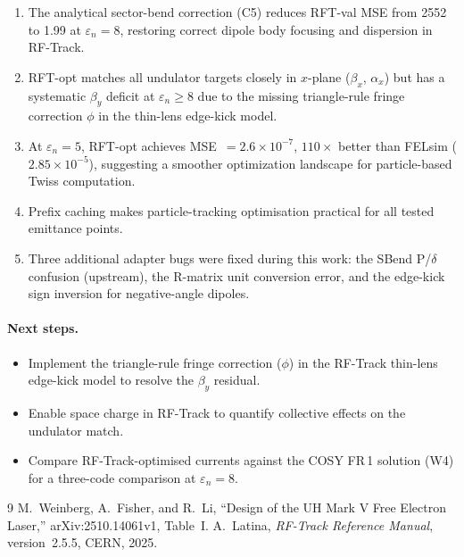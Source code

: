 \documentclass[11pt]{article}
\begin{document}
\begin{enumerate}
  \item The analytical sector-bend correction (C5) reduces RFT-val MSE
    from 2552 to 1.99 at $\varepsilon_n = 8$, restoring correct dipole
    body focusing and dispersion in RF-Track.
  \item RFT-opt matches all undulator targets closely in $x$-plane
    ($\beta_x$, $\alpha_x$) but has a systematic $\beta_y$ deficit at
    $\varepsilon_n \geq 8$ due to the missing triangle-rule fringe
    correction $\phi$ in the thin-lens edge-kick model.
  \item At $\varepsilon_n = 5$, RFT-opt achieves MSE~$= 2.6 \times 10^{-7}$,
    $110\times$ better than FELsim ($2.85 \times 10^{-5}$), suggesting a
    smoother optimization landscape for particle-based Twiss computation.
  \item Prefix caching makes particle-tracking optimisation practical for
    all tested emittance points.
  \item Three additional adapter bugs were fixed during this work: the
    SBend P/$\delta$ confusion (upstream), the R-matrix unit conversion
    error, and the edge-kick sign inversion for negative-angle dipoles.
\end{enumerate}

\paragraph{Next steps.}
\begin{itemize}
  \item Implement the triangle-rule fringe correction ($\phi$) in the
    RF-Track thin-lens edge-kick model to resolve the $\beta_y$ residual.
  \item Enable space charge in RF-Track to quantify collective effects
    on the undulator match.
  \item Compare RF-Track-optimised currents against the COSY FR\,1 solution
    (W4) for a three-code comparison at $\varepsilon_n = 8$.
\end{itemize}


\begin{thebibliography}{9}
  M.~Weinberg, A.~Fisher, and R.~Li,
  ``Design of the UH Mark V Free Electron Laser,''
  arXiv:2510.14061v1, Table~I.
  A.~Latina,
  \emph{RF-Track Reference Manual}, version~2.5.5,
  CERN, 2025.
\end{thebibliography}
\end{document}
